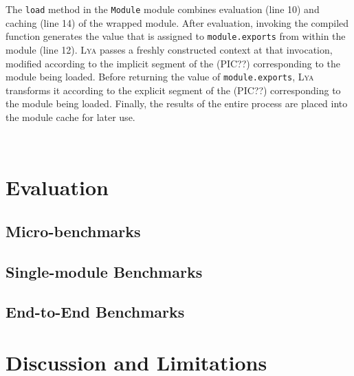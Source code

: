 \documentclass[letterpaper,twocolumn,10pt]{article}
\newcommand{\ttt}[1]{\texttt{#1}}
\newcommand{\sys}{{\scshape Lya}\xspace}
\begin{document}

The \ttt{load} method in the \ttt{Module} module combines evaluation (line 10) and caching (line 14) of the wrapped module.
After evaluation, invoking the compiled function generates the value that is assigned to \ttt{module.exports} from within the module (line 12).
\sys passes a freshly constructed context at that invocation, modified according to the implicit segment of the (PIC??) corresponding to the module being loaded.
Before returning the value of \ttt{module.exports}, \sys transforms it according to the explicit segment of the (PIC??) corresponding to the module being loaded.
Finally, the results of the entire process are placed into the module cache for later use.

\

\section{Evaluation}
\label{eval}

\subsection{Micro-benchmarks}
\label{micro}

\subsection{Single-module Benchmarks}
\label{meso}

\subsection{End-to-End Benchmarks}
\label{macro}

\section{Discussion and Limitations}
\label{diss}
\end{document}
